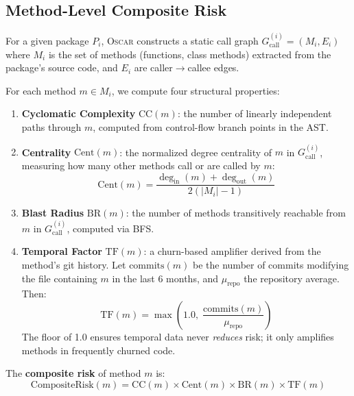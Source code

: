\documentclass[conference]{IEEEtran}
\begin{document}
\subsection{Method-Level Composite Risk}
\label{subsec:composite-risk}

For a given package $P_i$, \textsc{Oscar} constructs a static call graph $G_{\mathrm{call}}^{(i)} = (M_i, E_i)$ where $M_i$ is the set of methods (functions, class methods) extracted from the package's source code, and $E_i$ are caller$\to$callee edges.

For each method $m \in M_i$, we compute four structural properties:

\begin{enumerate}
    \item \textbf{Cyclomatic Complexity} $\mathrm{CC}(m)$: the number of linearly independent paths through $m$, computed from control-flow branch points in the AST.
    
    \item \textbf{Centrality} $\mathrm{Cent}(m)$: the normalized degree centrality of $m$ in $G_{\mathrm{call}}^{(i)}$, measuring how many other methods call or are called by $m$:
    \begin{equation}
        \mathrm{Cent}(m) = \frac{\deg_{\mathrm{in}}(m) + \deg_{\mathrm{out}}(m)}{2(|M_i| - 1)}
    \end{equation}
    
    \item \textbf{Blast Radius} $\mathrm{BR}(m)$: the number of methods transitively reachable from $m$ in $G_{\mathrm{call}}^{(i)}$, computed via BFS.
    
    \item \textbf{Temporal Factor} $\mathrm{TF}(m)$: a churn-based amplifier derived from the method's git history. Let $\mathrm{commits}(m)$ be the number of commits modifying the file containing $m$ in the last 6 months, and $\mu_{\mathrm{repo}}$ the repository average. Then:
    \begin{equation}
        \mathrm{TF}(m) = \max\!\left(1.0,\; \frac{\mathrm{commits}(m)}{\mu_{\mathrm{repo}}}\right)
    \end{equation}
    The floor of 1.0 ensures temporal data never \emph{reduces} risk; it only amplifies methods in frequently churned code.
\end{enumerate}

The \textbf{composite risk} of method $m$ is:
\begin{equation}
    \label{eq:composite}
    \mathrm{CompositeRisk}(m) = \mathrm{CC}(m) \times \mathrm{Cent}(m) \times \mathrm{BR}(m) \times \mathrm{TF}(m)
\end{equation}
\end{document}

